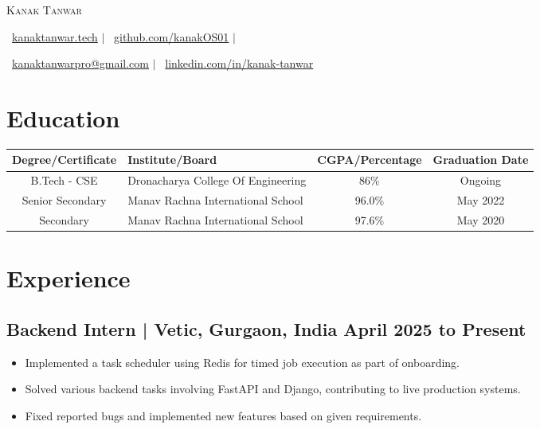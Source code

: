 \documentclass[a4paper,11pt]{article}
\begin{document}
\pagestyle{empty} %

\vspace{-10mm}
\begin{center}
    {\Huge\scshape Kanak Tanwar}
    
    \vspace{0.01em}
    \faGlobe\ \href{https://kanaktanwar.tech}{kanaktanwar.tech} $\vert$
    \faGithub\ \href{https://github.com/kanakOS01}{github.com/kanakOS01} $\vert$
    
    \faEnvelope\ \href{mailto:kanaktanwarpro@gmail.com}{kanaktanwarpro@gmail.com} $\vert$
    \faLinkedin\ \href{https://www.linkedin.com/in/kanak-tanwar/}{linkedin.com/in/kanak-tanwar}
\end{center} 
\vspace{-5mm}

\section{Education}
\vspace{-2mm}
    \setlength{\tabcolsep}{2pt} %
    \small\begin{tabularx}{\textwidth}{|c|Y|c|c|}
      \hline
      \textbf{Degree/Certificate} & \textbf{Institute/Board} & \textbf{CGPA/Percentage} & \textbf{Graduation Date}\\
      \hline
      B.Tech - CSE & Dronacharya College Of Engineering & 86\% & Ongoing\\
      \hline
      Senior Secondary & Manav Rachna International School & 96.0\% & May 2022 \\
      \hline
      Secondary & Manav Rachna International School & 97.6\% & May 2020 \\
      \hline
    \end{tabularx}
\vspace{-5mm}

\section*{Experience}
\vspace{-2mm}

\subsection{Backend Intern | Vetic, Gurgaon, India
\hfill April 2025 to Present}
\begin{itemize}[itemsep=0pt,parsep=0pt,topsep=0pt,partopsep=0pt]
    \item Implemented a task scheduler using Redis for timed job execution as part of onboarding.
    \item Solved various backend tasks involving FastAPI and Django, contributing to live production systems.
    \item Fixed reported bugs and implemented new features based on given requirements.
\end{itemize}
\vspace{-3mm}
\end{document}
